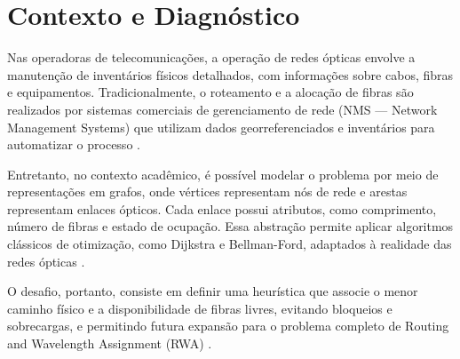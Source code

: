 \section{Contexto e Diagnóstico} \label{sec:context}

Nas operadoras de telecomunicações, a operação de redes ópticas envolve a
manutenção de inventários físicos detalhados, com informações sobre cabos,
fibras e equipamentos. Tradicionalmente, o roteamento e a alocação de fibras
são realizados por sistemas comerciais de gerenciamento de rede (NMS — Network
Management Systems) que utilizam dados georreferenciados e inventários para
automatizar o processo \cite{livroprofessor}.

Entretanto, no contexto acadêmico, é possível modelar o problema por meio de
representações em grafos, onde vértices representam nós de rede e arestas
representam enlaces ópticos. Cada enlace possui atributos, como comprimento,
número de fibras e estado de ocupação. Essa abstração permite aplicar
algoritmos clássicos de otimização, como Dijkstra e Bellman-Ford, adaptados à
realidade das redes ópticas \cite{bazaraa2011linear}.

O desafio, portanto, consiste em definir uma heurística que associe o menor
caminho físico e a disponibilidade de fibras livres, evitando bloqueios e
sobrecargas, e permitindo futura expansão para o problema completo de Routing
and Wavelength Assignment (RWA) \cite{artigorwa}.
